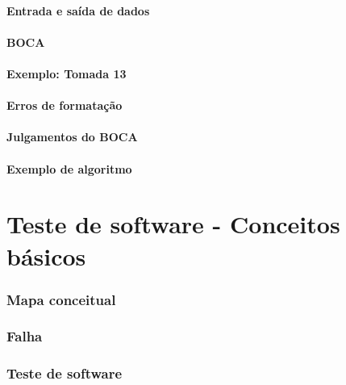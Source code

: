 \documentclass[utf8, usepdftitle=false, svgnames, color={table, fixpdftex, hyperref, fixinclude, xcdraw}, t, brazil]{beamer}
\begin{document}
			\subsection{Entrada e saída de dados}
			

			\subsection{BOCA}
			

			\subsection{Exemplo: Tomada 13}
			

			\subsection{Erros de formatação}
			

			\subsection{Julgamentos do BOCA}
			

			\subsection{Exemplo de algoritmo}
			


	\part{Teste de software - Conceitos básicos}

		\section{Mapa conceitual}
		

		\section{Falha}
		

		\section{Teste de software}
		
\end{document}
